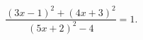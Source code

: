 \begin{ex}[type=equation]
	\begin{condition}
		$\dfrac{(3x-1)^2 + (4x + 3)^2}{(5x + 2)^2 - 4} = 1.$
	\end{condition}
\end{ex}